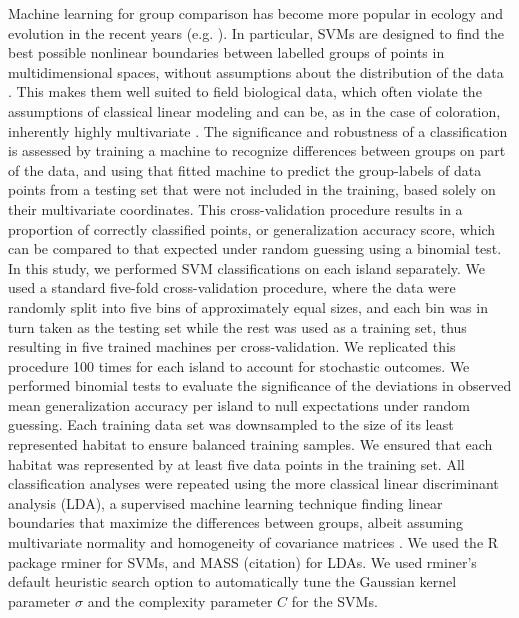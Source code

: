 
Machine learning for group comparison has become more popular in ecology and evolution in the recent years (e.g. \citet{Pigot2020}). In particular, SVMs are designed to find the best possible nonlinear boundaries between labelled groups of points in multidimensional spaces, without assumptions about the distribution of the data \citep{Cortes1995, Cristianini2000, Kim2018}. This makes them well suited to field biological data, which often violate the assumptions of classical linear modeling \citep{Kim2018} and can be, as in the case of coloration, inherently highly multivariate \citep{Cuthill1999}. The significance and robustness of a classification is assessed by training a machine to recognize differences between groups on part of the data, and using that fitted machine to predict the group-labels of data points from a testing set that were not included in the training, based solely on their multivariate coordinates. This cross-validation procedure results in a proportion of correctly classified points, or generalization accuracy score, which can be compared to that expected under random guessing using a binomial test.\\

In this study, we performed SVM classifications on each island separately. We used a standard five-fold cross-validation procedure, where the data were randomly split into five bins of approximately equal sizes, and each bin was in turn taken as the testing set while the rest was used as a training set, thus resulting in five trained machines per cross-validation. We replicated this procedure 100 times for each island to account for stochastic outcomes. We performed binomial tests to evaluate the significance of the deviations in observed mean generalization accuracy per island to null expectations under random guessing. Each training data set was downsampled to the size of its least represented habitat to ensure balanced training samples. We ensured that each habitat was represented by at least five data points in the training set. All classification analyses were repeated using the more classical linear discriminant analysis (LDA), a supervised machine learning technique finding linear boundaries that maximize the differences between groups, albeit assuming multivariate normality and homogeneity of covariance matrices \citep{Ripley1996a}. We used the R package rminer \citep{Cortez2010, Cortez2016} for SVMs, and MASS (citation) for LDAs. We used rminer's default heuristic search option to automatically tune the Gaussian kernel parameter $\sigma$ and the complexity parameter $C$ for the SVMs.\\


